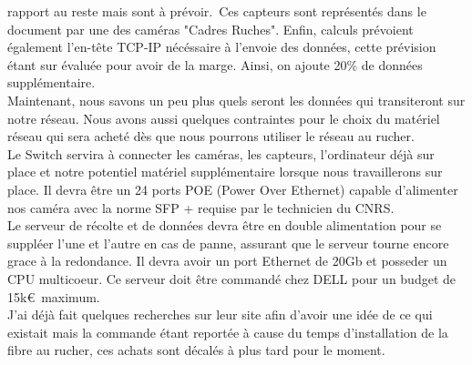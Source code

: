 \documentclass[11pt,french,a4paper]{report}
\begin{document}
rapport au reste mais sont à prévoir. Ces capteurs sont représentés dans le document par une des caméras "Cadres Ruches". 
Enfin, calculs prévoient également l'en-tête TCP-IP nécéssaire à l'envoie des données, cette prévision étant sur évaluée 
pour avoir de la marge. Ainsi, on ajoute 20\% de données supplémentaire.\\
Maintenant, nous savons un peu plus quels seront les données qui transiteront sur notre réseau. Nous avons aussi
quelques contraintes pour le choix du matériel réseau qui sera acheté dès que nous pourrons utiliser le réseau au rucher. \\
Le Switch servira à connecter les caméras, les capteurs, l'ordinateur déjà sur place et notre potentiel matériel supplémentaire
lorsque nous travaillerons sur place. Il devra être un 24 ports POE (Power Over Ethernet) capable 
d'alimenter nos caméra avec la norme SFP + requise par le technicien du CNRS. \\
Le serveur de récolte et de données devra être en double alimentation pour se suppléer l'une et l'autre en cas de panne,
assurant que le serveur tourne encore grace à la redondance. Il devra avoir un port Ethernet de 20Gb et posseder un CPU multicoeur.
Ce serveur doit être commandé chez DELL pour un budget de 15k€ maximum. \\
J'ai déjà fait quelques recherches sur leur site afin d'avoir une idée de ce qui existait mais la commande étant reportée à cause
du temps d'installation de la fibre au rucher, ces achats sont décalés à plus tard pour le moment.\\ 
\end{document}
